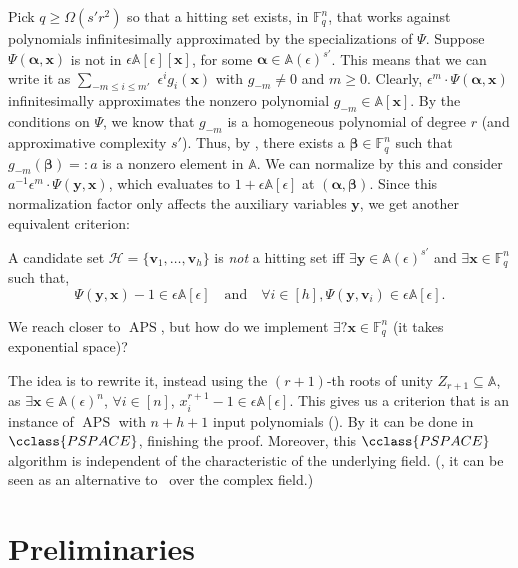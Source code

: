 \documentclass{toc}
\newcommand{\F}{\mathbb{F}}
\newcommand{\calH}{\mathcal{H}}
\newcommand{\aff}{\mathbb{A}}
\newcommand{\PSPACE}{\cclass{PSPACE}\xspace}  %
\DeclareMathOperator{\APS}{\mathrm{APS}\xspace} %
\begin{document}
Pick $q\ge\Omega(s'r^2)$ so that a hitting set exists, in $\F_q^n$, that works against polynomials infinitesimally approximated by the specializations of $\Psi$. 
Suppose $\Psi(\mathbf{\alpha,x})$ is not in $\epsilon\aff[\epsilon][\mathbf x]$, for some $\mathbf \alpha\in \aff(\epsilon)^{s'}$. This means that we can write it as $\sum_{-m\le i\le m'}$ $\epsilon^i g_i(\mathbf x)$ with $g_{-m}\ne0$ and $m\ge0$. Clearly, $\epsilon^m\cdot \Psi(\mathbf{\alpha,x})$ infinitesimally approximates the nonzero polynomial $g_{-m} \in \aff[\mathbf x]$.
By the conditions on $\Psi$, we know that $g_{-m}$ is a homogeneous 
%
polynomial of degree $r$ %
(and approximative complexity $s'$). Thus, by 
%
%
%
,  %
there exists a $\mathbf \beta\in\F_q^n$ such that $g_{-m}(\mathbf \beta)=:a$ is a nonzero element in $\aff$. We can normalize by this and consider $a^{-1}\epsilon^m\cdot \Psi(\mathbf{y,x})$, which evaluates to $1+\epsilon\aff[\epsilon]$ at $(\mathbf{\alpha,\beta})$. Since this normalization factor only affects the auxiliary variables $\mathbf y$, we get another equivalent criterion:

%
A candidate set %
$\calH= \{\mathbf v_1,\ldots, \mathbf v_h\}$ is \emph{not} a hitting set iff 
$\exists \mathbf y\in \aff(\epsilon)^{s'}$ and $\exists \mathbf x\in \F_q^n$  such that,
  \[
    \Psi(\mathbf{y,x}) - 1 \in \epsilon\aff[\epsilon]\quad\text{and}\quad \forall i\in[h],  \Psi(\mathbf y, \mathbf v_i)\in \epsilon\aff[\epsilon].
  \]

\smallskip
We reach closer to $\APS$, but how do we implement $\exists? \mathbf x\in \F_q^n $ (it takes exponential space)? 

The idea is to rewrite it, instead using the $(r+1)$-th roots of unity $Z_{r+1}\subseteq\aff$, 
%
as %
$\exists \mathbf x\in \aff(\epsilon)^n$, $\forall i\in[n]$, $x_i^{r+1}-1 \in \epsilon\aff[\epsilon]$. This gives us a criterion that is an instance of $\APS$ with $n+h+1$ input polynomials (). By  it can be done in 
%
$\PSPACE$, %
finishing the proof. Moreover, this $\PSPACE$ algorithm 
%
is independent of 
%
the characteristic of the underlying field. %
(\Eg, it can be seen as an alternative to~\cite{forbes2017pspace} over the complex field.)

%
\section{Preliminaries}\label{sec-prelim}
%
\end{document}
